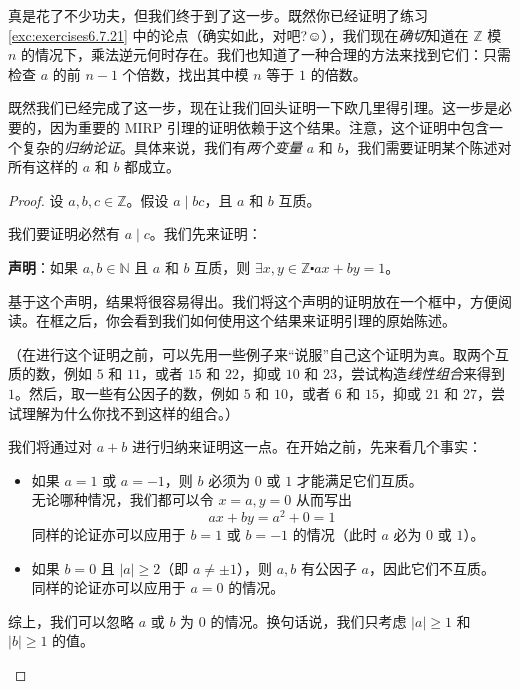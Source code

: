 真是花了不少功夫，但我们终于到了这一步。既然你已经证明了练习 \ref{exc:exercises6.7.21} 中的论点（确实如此，对吧?$\smiley{}$），我们现在\emph{确切}知道在 $\mathbb{Z}$ 模 $n$ 的情况下，乘法逆元何时存在。我们也知道了一种合理的方法来找到它们：只需检查 $a$ 的前 $n-1$ 个倍数，找出其中模 $n$ 等于 $1$ 的倍数。

既然我们已经完成了这一步，现在让我们回头证明一下欧几里得引理。这一步是必要的，因为重要的 MIRP 引理的证明依赖于这个结果。注意，这个证明中包含一个复杂的\emph{归纳论证}。具体来说，我们有\emph{两个变量} $a$ 和 $b$，我们需要证明某个陈述对所有这样的 $a$ 和 $b$ 都成立。

\begin{proof}
    设 $a, b, c \in \mathbb{Z}$。假设 $a \mid bc$，且 $a$ 和 $b$ 互质。

    我们要证明必然有 $a \mid c$。我们先来证明：

    \textbf{声明}：如果 $a, b \in \mathbb{N}$ 且 $a$ 和 $b$ 互质，则 $\exists x, y \in \mathbb{Z} \centerdot ax+by = 1$。

    基于这个声明，结果将很容易得出。我们将这个声明的证明放在一个框中，方便阅读。在框之后，你会看到我们如何使用这个结果来证明引理的原始陈述。

    （在进行这个证明之前，可以先用一些例子来``说服''自己这个证明为\verb|真|。取两个互质的数，例如 $5$ 和 $11$，或者 $15$ 和 $22$，抑或 $10$ 和 $23$，尝试构造\emph{线性组合}来得到 $1$。然后，取一些有公因子的数，例如 $5$ 和 $10$，或者 $6$ 和 $15$，抑或 $21$ 和 $27$，尝试理解为什么你找不到这样的组合。）

    \begin{tcolorbox}[colback=gray!10,%
        colframe=black,%
        width=\textwidth,%
        arc=2mm, auto outer arc,
        title={证明声明},breakable,enhanced jigsaw,
        before upper={\parindent15pt\noindent},	]
            我们将通过对 $a+b$ 进行归纳来证明这一点。在开始之前，先来看几个事实：
            \begin{itemize}
                \item 如果 $a=1$ 或 $a=-1$，则 $b$ 必须为 $0$ 或 $1$ 才能满足它们互质。\\
                    无论哪种情况，我们都可以令 $x=a, y=0$ 从而写出
                    \[ax + by = a^2 + 0 = 1\]
                    同样的论证亦可以应用于 $b=1$ 或 $b=-1$ 的情况（此时 $a$ 必为 $0$ 或 $1$）。
                \item 如果 $b=0$ 且 $|a| \ge 2$（即 $a \ne \pm 1$），则 $a, b$ 有公因子 $a$，因此它们不互质。\\
                    同样的论证亦可以应用于 $a=0$ 的情况。
            \end{itemize}
            综上，我们可以忽略 $a$ 或 $b$ 为 $0$ 的情况。换句话说，我们只考虑 $|a| \ge 1$ 和 $|b| \ge 1$ 的值。\\


\end{tcolorbox}
\end{proof}
